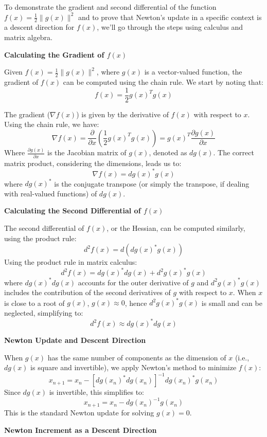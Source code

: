 \documentclass[8pt]{article}
\begin{document}
To demonstrate the gradient and second differential of the function \( f(x) = \frac{1}{2} \|g(x)\|^2 \) and to prove that Newton's update in a specific context is a descent direction for \( f(x) \), we'll go through the steps using calculus and matrix algebra.

\textbf{Calculating the Gradient of \( f(x) \)}

Given \( f(x) = \frac{1}{2} \|g(x)\|^2 \), where \( g(x) \) is a vector-valued function, the gradient of \( f(x) \) can be computed using the chain rule. We start by noting that:
\[
f(x) = \frac{1}{2} g(x)^T g(x)
\]

The gradient (\(\nabla f(x)\)) is given by the derivative of \( f(x) \) with respect to \( x \). Using the chain rule, we have:
\[
\nabla f(x) = \frac{\partial}{\partial x} \left( \frac{1}{2} g(x)^T g(x) \right) = g(x)^T \frac{\partial g(x)}{\partial x}
\]
Where \(\frac{\partial g(x)}{\partial x}\) is the Jacobian matrix of \( g(x) \), denoted as \( dg(x) \). The correct matrix product, considering the dimensions, leads us to:
\[
\nabla f(x) = dg(x)^* g(x)
\]
where \( dg(x)^* \) is the conjugate transpose (or simply the transpose, if dealing with real-valued functions) of \( dg(x) \).

\textbf{Calculating the Second Differential of \( f(x) \)}

The second differential of \( f(x) \), or the Hessian, can be computed similarly, using the product rule:
\[
d^2 f(x) = d(dg(x)^* g(x))
\]
Using the product rule in matrix calculus:
\[
d^2 f(x) = dg(x)^* dg(x) + d^2 g(x)^* g(x)
\]
where \( dg(x)^* dg(x) \) accounts for the outer derivative of \( g \) and \( d^2 g(x)^* g(x) \) includes the contribution of the second derivatives of \( g \) with respect to \( x \). When \( x \) is close to a root of \( g(x) \), \( g(x) \approx 0 \), hence \( d^2 g(x)^* g(x) \) is small and can be neglected, simplifying to:
\[
d^2 f(x) \approx dg(x)^* dg(x)
\]

\textbf{Newton Update and Descent Direction}

When \( g(x) \) has the same number of components as the dimension of \( x \) (i.e., \( dg(x) \) is square and invertible), we apply Newton's method to minimize \( f(x) \):
\[
x_{n+1} = x_n - [dg(x_n)^* dg(x_n)]^{-1} dg(x_n)^* g(x_n)
\]
Since \( dg(x) \) is invertible, this simplifies to:
\[
x_{n+1} = x_n - dg(x_n)^{-1} g(x_n)
\]
This is the standard Newton update for solving \( g(x) = 0 \).

\textbf{Newton Increment as a Descent Direction}
\end{document}
